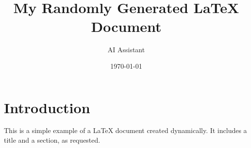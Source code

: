 \documentclass{article}
\title{My Randomly Generated LaTeX Document}
\author{AI Assistant}
\date{\today}
\begin{document}
\maketitle

\section{Introduction}
This is a simple example of a LaTeX document created dynamically. It includes a title and a section, as requested.
\end{document}
